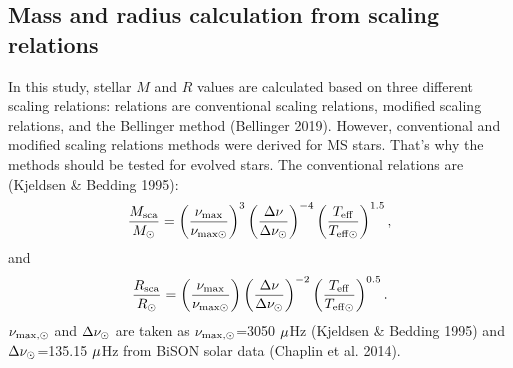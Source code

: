 \documentclass[a4paper,fleqn,usenatbib]{mnras}     %
\begin{document}
{\subsection{Mass and radius calculation from scaling relations}
In this study, stellar $M$ and $R$ values are calculated based on three different scaling relations: relations are
conventional scaling relations, 
modified scaling relations, and 
the Bellinger method (Bellinger 2019).
However, conventional and  
modified scaling relations methods 
were derived for MS stars.
That's why 
the methods 
should be tested for evolved stars.
The conventional relations are (Kjeldsen \& Bedding 1995):
\begin{equation}
\frac{M_{\rm sca}}{M_{\rm \odot}}= \left(\frac{\nu_{\rm max}}{\nu_{\rm max\odot}}\right)^3\left(\frac{{{\Delta\nu_{\rm }}}}{{{\Delta\nu_{\rm \odot}}}}\right)^{-4}\left(\frac{T_{\rm eff}}{T_{\rm eff \odot}}\right)^{1.5}, 
\end{equation}
and
\begin{equation}
\frac{R_{\rm sca}}{R_{\rm \odot}}= \left(\frac{\nu_{\rm max}}{\nu_{\rm max\odot}}\right)\left(\frac{{{\Delta\nu_{\rm }}}}{{{\Delta\nu_{\rm \odot}}}}\right)^{-2}\left(\frac{T_{\rm eff}}{T_{\rm eff \odot}}\right)^{0.5}. 
\end{equation}
${\nu_{\rm max, \odot}}$  and  ${\Delta\nu_{\rm \odot}}$ are taken as ${\nu_{\rm max, \odot}}$=3050 ${\rm \mu}$Hz (Kjeldsen \& Bedding 1995) and ${\Delta\nu_{\rm \odot}}$=135.15 ${\rm \mu }$Hz from BiSON solar data (Chaplin et al. 2014).


}
\end{document}
